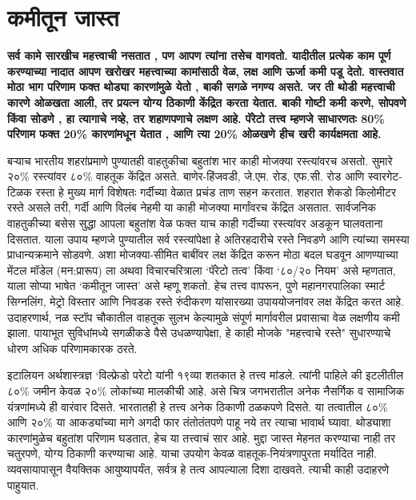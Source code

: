 \chapter{कमीतून जास्त}

\textcolor{blue!60!black}{\textbf{सर्व कामे सारखीच महत्त्वाची नसतात , पण आपण त्यांना तसेच वागवतो. यादीतील प्रत्येक काम पूर्ण करण्याच्या नादात आपण खरोखर महत्त्वाच्या कामांसाठी वेळ, लक्ष आणि ऊर्जा कमी पडू देतो. वास्तवात मोठा भाग परिणाम फक्त थोड्या कारणांमुळे येतो , बाकी सगळे नगण्य असते. जर ती थोडी महत्त्वाची कारणे ओळखता आली, तर प्रयत्न योग्य ठिकाणी केंद्रित करता येतात. बाकी गोष्टी कमी करणे, सोपवणे किंवा सोडणे , हा त्यागाचे नव्हे, तर शहाणपणाचे लक्षण आहे. पॅरेटो तत्त्व म्हणजे साधारणतः 80\% परिणाम फक्त 20\% कारणांमधून येतात , आणि त्या 20\% ओळखणे हीच खरी कार्यक्षमता आहे.}}

बऱ्याच भारतीय शहरांप्रमाणे पुण्यातही वाहतुकीचा बहुतांश भार काही मोजक्या रस्त्यांवरच असतो. सुमारे २०\% रस्त्यांवर ८०\% वाहतूक केंद्रित असते. बाणेर-हिंजवडी, जे.एम. रोड, एफ.सी. रोड आणि स्वारगेट-टिळक रस्ता हे मुख्य मार्ग विशेषतः गर्दीच्या वेळात प्रचंड ताण सहन करतात. शहरात शेकडो किलोमीटर रस्ते असले तरी, गर्दी आणि विलंब नेहमी या काही मोजक्या मार्गांवरच केंद्रित असतात. सार्वजनिक वाहतुकीच्या बसेस सुद्धा आपला बहुतांश वेळ फक्त याच काही गर्दीच्या रस्त्यांवर अडकून घालवताना दिसतात. याला उपाय म्हणजे पुण्यातील सर्व रस्त्यांपेक्षा हे अतिरहदारीचे रस्ते निवडणे आणि त्यांच्या समस्या प्राधान्यक्रमाने सोडवणे. अशा मोजक्या-सीमित बाबींवर लक्ष केंद्रित करून मोठा बदल घडवून आणण्याच्या मेंटल मॉडेल (मन:प्रारूप) ला अथवा विचारचरित्राला ‘पॅरेटो तत्व’ किंवा ‘८०/२० नियम’ असे म्हणतात, याला सोप्या भाषेत ‘कमीतून जास्त’ असे म्हणू शकतो. हेच तत्त्व वापरून, पुणे महानगरपालिका स्मार्ट सिग्नलिंग, मेट्रो विस्तार आणि निवडक रस्ते रुंदीकरण यांसारख्या उपाययोजनांवर लक्ष केंद्रित करत आहे. उदाहरणार्थ, नळ स्टॉप चौकातील वाहतूक सुलभ केल्यामुळे संपूर्ण मार्गावरील प्रवासाचा वेळ लक्षणीय कमी झाला. पायाभूत सुविधांमध्ये सगळीकडे पैसे उधळण्यापेक्षा, हे काही मोजके "महत्त्वाचे रस्ते" सुधारण्याचे धोरण अधिक परिणामकारक ठरते.

इटालियन अर्थशास्त्रज्ञ ‘विल्फ्रेडो परेटो यांनी १९व्या शतकात हे तत्त्व मांडले. त्यांनी पाहिले की इटलीतील ८०\% जमीन केवळ २०\% लोकांच्या मालकीची आहे. असे चित्र जगभरातील अनेक नैसर्गिक व सामाजिक यंत्रणांमध्ये ही वारंवार दिसते. भारतातही हे तत्त्व अनेक ठिकाणी ठळकपणे दिसते. या तत्वातील ८०\% आणि २०\% या आकड्यांच्या मागे अगदी  फार तंतोतंतपणे पाहू नये तर त्याचा भावार्थ घ्यावा. थोड्याशा कारणांमुळेच बहुतांश परिणाम घडतात, हेच या तत्त्वाचं सार आहे. मुद्दा जास्त मेहनत करण्याचा नाही तर चतुरपणे, योग्य ठिकाणी करण्याचा आहे. याचा उपयोग केवळ वाहतूक-नियंत्रणापुरता मर्यादित नाही. व्यवसायापासून वैयक्तिक आयुष्यापर्यंत, सर्वत्र हे तत्व आपल्याला दिशा दाखवते. त्याची काही उदाहरणे पाहुयात. 

